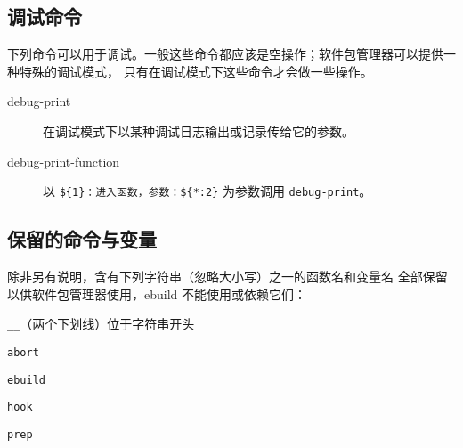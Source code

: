\subsection{调试命令}
下列命令可以用于调试。一般这些命令都应该是空操作；软件包管理器可以提供一种特殊的调试模式，
只有在调试模式下这些命令才会做一些操作。

\begin{description}
\item[debug-print] 在调试模式下以某种调试日志输出或记录传给它的参数。
\item[debug-print-function] 以 \texttt{\$\{1\}：进入函数，参数：\$\{*:2\}}
    为参数调用 \texttt{debug-print}。
\end{description}

\subsection{保留的命令与变量}

除非另有说明，含有下列字符串（忽略大小写）之一的函数名和变量名
全部保留以供软件包管理器使用，ebuild 不能使用或依赖它们：

\begin{compactitem}
\item \texttt{__}（两个下划线）位于字符串开头
\item \texttt{abort}
\item \texttt{ebuild}
\item \texttt{hook}
\item \texttt{prep}
\end{compactitem}


